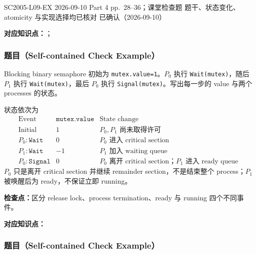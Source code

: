 

\examplemeta
  {SC2005-L09-EX}
  {2026-09-10}
  {Part 4 pp.~28--36；课堂检查题}
  {题干、状态变化、atomicity 与实现选择均已核对}
  {已确认（2026-09-10）}


\textbf{对应知识点：}；

\subsubsection*{题目（Self-contained Check Example）}

Blocking binary semaphore 初始为 \texttt{mutex.value=1}。$P_0$ 执行 \texttt{Wait(mutex)}，随后 $P_1$ 执行 \texttt{Wait(mutex)}，最后 $P_0$ 执行 \texttt{Signal(mutex)}。写出每一步的 value 与两个 processes 的状态。

\begin{checkedsolution}
状态依次为
\[
\begin{array}{c|c|l}
  \text{Event} & \texttt{mutex.value} & \text{State change}\\
  \hline
  \text{Initial} & 1 & P_0,P_1\text{ 尚未取得许可}\\
  P_0:\texttt{Wait} & 0 & P_0\text{ 进入 critical section}\\
  P_1:\texttt{Wait} & -1 & P_1\text{ 加入 waiting queue}\\
  P_0:\texttt{Signal} & 0 & P_0\text{ 离开 critical section；}P_1\text{ 进入 ready queue}
\end{array}
\]
$P_0$ 只是离开 critical section 并继续 remainder section，不是结束整个 process；$P_1$ 被唤醒后为 ready，不保证立即 running。
\end{checkedsolution}

\textbf{检查点：}区分 release lock、process termination、ready 与 running 四个不同事件。


\textbf{对应知识点：}

\subsubsection*{题目（Self-contained Check Example）}

